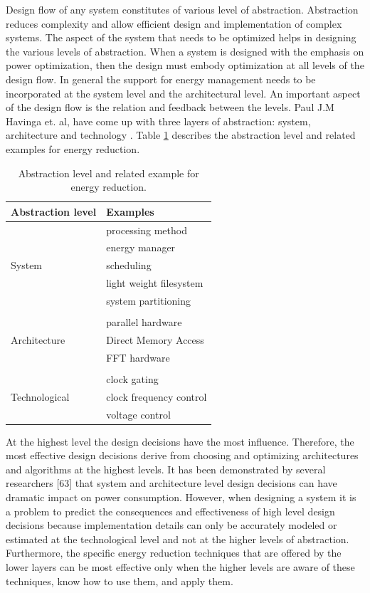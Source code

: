  Design flow of any system constitutes of various level of abstraction. Abstraction reduces complexity and allow efficient design and implementation of complex systems. The aspect of the system that needs to be optimized helps in designing the various levels of abstraction. When a system is designed with the emphasis on power optimization, then the design must embody optimization at all levels of the design flow. In general the support for energy management needs to be incorporated at the system level and the architectural level. An important aspect of the design flow is the relation and feedback between the levels. Paul J.M Havinga et. al, have come up with three layers of abstraction: system, architecture and technology \cite{havinga, havinga2, havinga3}. Table \ref{table:abstraction} describes the abstraction level and related examples for energy reduction.
 \begin{table}
 	\centering
 	\begin{tabular}{|l|l|}
 		\hline
 		Abstraction level & Examples  \\
 		\hline
 		  & processing method \\
 		  & energy manager \\
 		  System & scheduling \\
 		  & light weight filesystem \\
 		  & system partitioning \\
 		  & \\
 		  & parallel hardware \\
 		  Architecture & Direct Memory Access \\
 		  & FFT hardware \\
 		  &  \\
 		  & clock gating \\
 		  Technological & clock frequency control \\
 		  & voltage control \\
 		\hline
 	\end{tabular}
 	\caption{Abstraction level and related example for energy reduction.}
 	\label{table:abstraction}
 \end{table}


At the highest level the design decisions have the most influence. Therefore, the most effective design decisions derive from choosing and optimizing 
 architectures and algorithms at the highest levels. It has been demonstrated by several researchers [63] that system and architecture level design decisions can have dramatic impact on power consumption. However, when designing a system it is a problem to predict the consequences and effectiveness of high level design decisions because implementation details can only be accurately modeled or estimated at the technological 
 level and not at the higher levels of abstraction. Furthermore, the specific energy reduction techniques that are offered by the lower layers can be most effective only when the higher levels are aware of these techniques, know how to use them, and apply them.
 
